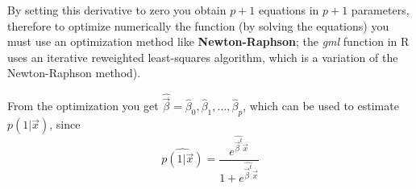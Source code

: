     By setting this derivative to zero you obtain $p+1$ equations in $p+1$
    parameters, therefore to optimize numerically the function (by solving the
    equations) you must use an optimization method like \textbf{Newton-Raphson};
    the \textit{gml} function in R uses an iterative reweighted least-squares
    algorithm, which is a variation of the Newton-Raphson method).

    From the optimization you get $\hat{\vec{\beta}} = \hat{\beta}_0,
    \hat{\beta}_1, \dots, \hat{\beta}_p $, which can be used to estimate
    $p(1|\vec{x})$, since
    $$\hat{p(1|\vec{x})} =
    \frac{e^{\hat{\vec{\beta}^t}\vec{x}}}{1+e^{\hat{\vec{\beta}^t}\vec{x}}}$$
